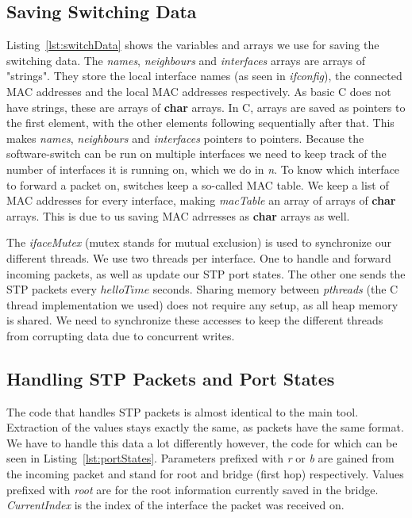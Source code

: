 \subsection{Saving Switching Data}

Listing~\ref{lst:switchData} shows the variables and arrays we use for saving the switching data.
The \textit{names}, \textit{neighbours} and \textit{interfaces} arrays are arrays of "strings".
They store the local interface names (as seen in \textit{ifconfig}), the connected MAC addresses and the local MAC addresses respectively.
As basic C does not have strings, these are arrays of \textbf{char} arrays.
In C, arrays are saved as pointers to the first element, with the other elements following sequentially after that.
This makes \textit{names}, \textit{neighbours} and \textit{interfaces} pointers to pointers.
Because the software-switch can be run on multiple interfaces we need to keep track of the number of interfaces it is running on, which we do in \textit{n}.
To know which interface to forward a packet on, switches keep a so-called MAC table.
We keep a list of MAC addresses for every interface, making \textit{macTable} an array of arrays of \textbf{char} arrays.
This is due to us saving MAC adrresses as \textbf{char} arrays as well.

The \textit{ifaceMutex} (mutex stands for mutual exclusion) is used to synchronize our different threads.
We use two threads per interface.
One to handle and forward incoming packets, as well as update our STP port states.
The other one sends the STP packets every $helloTime$ seconds.
Sharing memory between \textit{pthreads} (the C thread implementation we used) does not require any setup, as all heap memory is shared\cite{pthreads}.
We need to synchronize these accesses to keep the different threads from corrupting data due to concurrent writes.

\subsection{Handling STP Packets and Port States}
The code that handles STP packets is almost identical to the main tool.
Extraction of the values stays exactly the same, as packets have the same format.
We have to handle this data a lot differently however, the code for which can be seen in Listing~\ref{lst:portStates}.
Parameters prefixed with \textit{r} or \textit{b} are gained from the incoming packet and stand for root and bridge (first hop) respectively.
Values prefixed with \textit{root} are for the root information currently saved in the bridge.
\textit{CurrentIndex} is the index of the interface the packet was received on.


